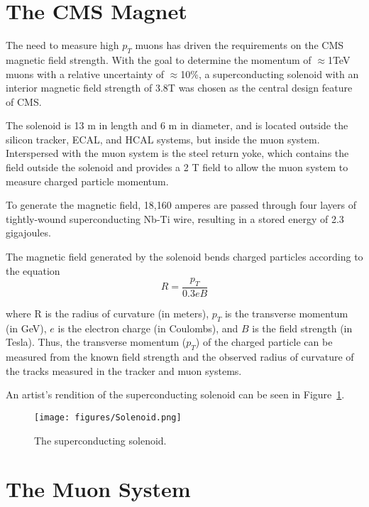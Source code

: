 \section{The CMS Magnet}

The need to measure high $p_{T}$ muons has driven the requirements on the CMS magnetic field strength. With the goal to determine the momentum of $\approx$1TeV muons with a relative uncertainty of $\approx $10\%, a superconducting solenoid with an interior magnetic field strength of 3.8T was chosen as the central design feature of CMS.

The solenoid is 13 m in length and 6 m in diameter, and is located outside the silicon tracker, ECAL, and HCAL systems, but inside the muon system. Interspersed with the muon system is the steel return yoke, which contains the field outside the solenoid and provides a 2 T field to allow the muon system to measure charged particle momentum. 

To generate the magnetic field, 18,160 amperes are passed through four layers of tightly-wound superconducting Nb-Ti wire, resulting in a stored energy of 2.3 gigajoules.

The magnetic field generated by the solenoid bends charged particles according to the equation
\begin{equation}
R = \frac{p_{T}}{0.3eB}
\end{equation}

\noindent where R is the radius of curvature (in meters), $p_{T}$ is the transverse momentum (in GeV), $e$ is the electron charge (in Coulombs), and $B$ is the field strength (in Tesla). Thus, the transverse momentum ($p_{T}$) of the charged particle can be measured from the known field strength and the observed radius of curvature of the tracks measured in the tracker and muon systems.\cite{TDR}

An artist's rendition of the superconducting solenoid can be seen in Figure~\ref{fig:Solenoid}.

\begin{figure}\centering
  \texttt{[image: figures/Solenoid.png]}
  \caption{\label{fig:Solenoid} The superconducting solenoid.}
\end{figure}

\section{The Muon System}

